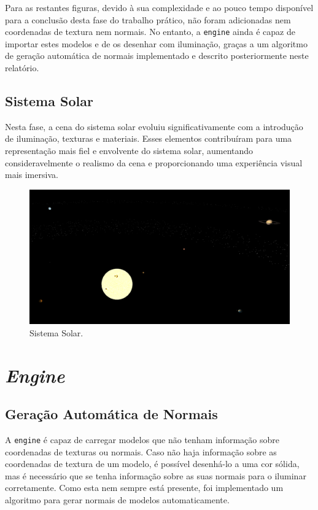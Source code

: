 \documentclass[12pt, a4paper]{article}
\begin{document}
Para as restantes figuras, devido à sua complexidade e ao pouco tempo disponível para a conclusão
desta fase do trabalho prático, não foram adicionadas nem coordenadas de textura nem normais. No
entanto, a \texttt{engine} ainda é capaz de importar estes modelos e de os desenhar com iluminação,
graças a um algoritmo de geração automática de normais implementado e descrito posteriormente neste
relatório.

\subsection{Sistema Solar}

Nesta fase, a cena do sistema solar evoluiu significativamente com a introdução de iluminação,
texturas e materiais. Esses elementos contribuíram para uma representação mais fiel e
envolvente do sistema solar, aumentando consideravelmente o realismo da cena e proporcionando
uma experiência visual mais imersiva.

\begin{figure}[H]
    \centering
    \includegraphics[width=\textwidth]{res/phase4/SolarSystem.png}
    \caption{Sistema Solar.}
\end{figure}

\section{\emph{Engine}}

\subsection{Geração Automática de Normais}

A \texttt{engine} é capaz de carregar modelos que não tenham informação sobre coordenadas de
texturas ou normais. Caso não haja informação sobre as coordenadas de textura de um modelo, é
possível desenhá-lo a uma cor sólida, mas é necessário que se tenha informação sobre as suas normais
para o iluminar corretamente. Como esta nem sempre está presente, foi implementado um algoritmo para
gerar normais de modelos automaticamente.
\end{document}
